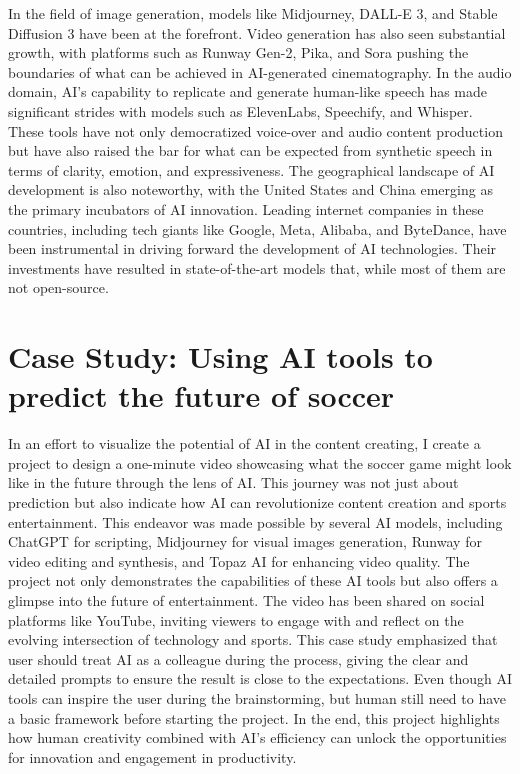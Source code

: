 \documentclass[11pt,a4paper,oneside]{report}
\begin{document}
In the field of image generation, models like Midjourney, DALL-E 3, and Stable Diffusion 3 have been at the forefront. 
Video generation has also seen substantial growth, with platforms such as Runway Gen-2, Pika, and Sora pushing the boundaries of what can be achieved in AI-generated cinematography. 
In the audio domain, AI's capability to replicate and generate human-like speech has made significant strides with models such as ElevenLabs, Speechify, and Whisper. 
These tools have not only democratized voice-over and audio content production but have also raised the bar for what can be expected from synthetic speech in terms of clarity, emotion, and expressiveness. 
The geographical landscape of AI development is also noteworthy, with the United States and China emerging as the primary incubators of AI innovation. 
Leading internet companies in these countries, including tech giants like Google, Meta, Alibaba, and ByteDance, have been instrumental in driving forward the development of AI technologies. 
Their investments have resulted in state-of-the-art models that, while most of them are not open-source.

\section{Case Study: Using AI tools to predict the future of soccer}
In an effort to visualize the potential of AI in the content creating, I create a project to design a one-minute video showcasing what the soccer game might look like in the future through the lens of AI. 
This journey was not just about prediction but also indicate how AI can revolutionize content creation and sports entertainment.
This endeavor was made possible by several AI models, including ChatGPT for scripting, Midjourney for visual images generation, Runway for video editing and synthesis, and Topaz AI for enhancing video quality. 
The project not only demonstrates the capabilities of these AI tools but also offers a glimpse into the future of entertainment. 
The video has been shared on social platforms like YouTube, inviting viewers to engage with and reflect on the evolving intersection of technology and sports.
This case study emphasized that user should treat AI as a colleague during the process, giving the clear and detailed prompts to ensure the result is close to the expectations.
Even though AI tools can inspire the user during the brainstorming, but human still need to have a basic framework before starting the project.
In the end, this project highlights how human creativity combined with AI's efficiency can unlock the opportunities for innovation and engagement in productivity.
\end{document}
